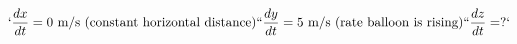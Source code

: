 \documentclass[preview]{standalone}
\begin{document}
\begin{align*}
`\frac{dx}{dt} = 0 \text{ m/s (constant horizontal distance)}`
`\frac{dy}{dt} = 5 \text{ m/s (rate balloon is rising)}`
`\frac{dz}{dt} = ?`
\end{align*}
\end{document}

